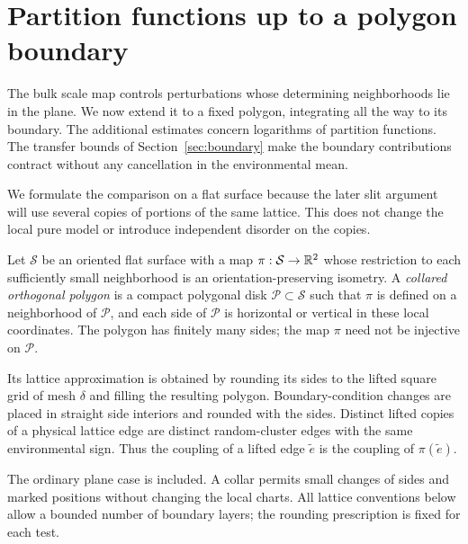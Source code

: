\section{Partition functions up to a polygon boundary}
\label{sec:polygon}

The bulk scale map controls perturbations whose determining neighborhoods
lie in the plane.  We now extend it to a fixed polygon, integrating all
the way to its boundary.  The additional estimates concern logarithms of
partition functions.  The transfer bounds of Section~\ref{sec:boundary}
make the boundary contributions contract without any cancellation in the
environmental mean.

We formulate the comparison on a flat surface because the later slit
argument will use several copies of portions of the same lattice.  This
does not change the local pure model or introduce independent disorder
on the copies.

\begin{definition}\label{def:sheet-polygon}
Let $\mathcal S$ be an oriented flat surface with a map
$\pi:\mathcal S\to\mathbb R^2$ whose restriction to each sufficiently small
neighborhood is an orientation-preserving isometry.  A \emph{collared
orthogonal polygon} is a compact polygonal disk $\mathcal P\subset
\mathcal S$ such that $\pi$ is defined on a neighborhood of
$\mathcal P$, and each side of $\mathcal P$ is horizontal or vertical in
these local coordinates.  The polygon has finitely many sides; the map
$\pi$ need not be injective on $\mathcal P$.

Its lattice approximation is obtained by rounding its sides to the
lifted square grid of mesh $\delta$ and filling the resulting polygon.
Boundary-condition changes are placed in straight side interiors and
rounded with the sides.  Distinct lifted copies of a physical lattice
edge are distinct random-cluster edges with the same environmental
sign.  Thus the coupling of a lifted edge $\widetilde e$ is the coupling
of $\pi(\widetilde e)$.
\end{definition}

The ordinary plane case is included.  A collar permits small changes
of sides and marked positions without changing the local charts.  All
lattice conventions below allow a bounded number of boundary layers;
the rounding prescription is fixed for each test.

